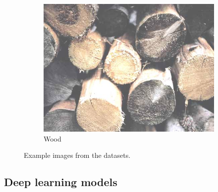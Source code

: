 \documentclass[12pt,a4paper]{article}
\begin{document}
\begin{figure}
\begin{subfigure}[c]{0.23\linewidth}
			\includegraphics[width=\linewidth]{./imgs/fmd4}
			\caption{Wood}
			\vspace{2mm}
		\end{subfigure}
		\caption{Example images from the datasets.}
		\label{fig:examples}
	\end{figure}
	
	
	\subsection{Deep learning models}
	
\end{document}
